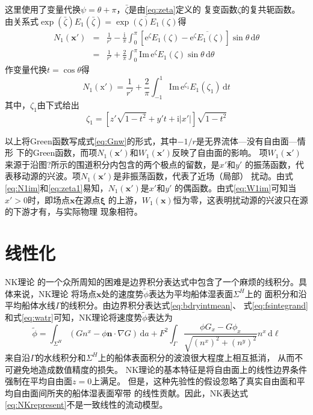 这里使用了变量代换$\psi=\theta+\pi$，$\bar{\zeta}$是由\eqref{eq:zeta}定义的
复变函数$\zeta$的复共轭函数。由关系式$\exp(\bar{\zeta})E_1(\bar{\zeta})=\overline{\exp(\zeta)E_1(\zeta)}$得
\begin{eqnarray*}
  N_1(\mathbf{x'})&=&\frac{1}{r'}-\frac{\mathrm{i}}{\pi}\int_0^\pi[\mathrm{e}^\zeta E_1(\zeta)-\overline{\mathrm{e}^\zeta E_1(\zeta)}]\sin\theta\,\mathrm{d}\theta\\
  &=&\frac{1}{r'}+\frac{2}{\pi}\int_0^\pi\mathrm{Im}\,\mathrm{e}^\zeta E_1(\zeta)
  \sin\theta\,\mathrm{d}\theta
\end{eqnarray*}
作变量代换$t=\cos\theta$得
\begin{equation}
  N_1(\mathrm{x'})=\frac{1}{r'}+\frac{2}{\pi}\int_{-1}^1\mathrm{Im}\,
  \mathrm{e}^{\zeta_1} E_1(\zeta_1)\,\mathrm{d}t
  \label{eq:N1im}
\end{equation}
其中，$\zeta_1$由下式给出
\begin{equation}
  \zeta_1=[z'\sqrt{1-t^2}+y't+\mathrm{i}|x'|]\sqrt{1-t^2}
  \label{eq:zeta1}
\end{equation}

以上将Green函数写成式\eqref{eq:Gnw}的形式，其中$-1/r$是无界流体---没有自由面---情形
下的Green函数，而项$N_1(\mathbf{x'})$和$W_1(\mathbf{x'})$反映了自由面的影响。
项$W_1(\mathbf{x'})$来源于沿图?所示的围道积分内包含的两个极点的留数，是$x'$和$y'$
的振荡函数，代表移动源的兴波。项$N_1(\mathbf{x'})$是非振荡函数，代表了近场（局部）
扰动。由式\eqref{eq:N1im}和\eqref{eq:zeta1}易知，$N_1(\mathbf{x'})$是$x'$和$y'$
的偶函数。由式\eqref{eq:W1im}可知当$x'>0$时，即场点$\mathbf{x}$在源点$\bm{\xi}$
的上游，$W_1(\mathbf{x})$恒为零，这表明扰动源的兴波只在源的下游才有，与实际物理
现象相符。

\section{线性化}
\label{sec:linearization}
NK理论\supercite{Brard1972representation,Gueval1974distribution}
的一个众所周知的困难是边界积分表达式中包含了一个麻烦的线积分。具体来说，NK理论
将场点$\mathbf{x}$处的速度势$\tilde{\phi}$表达为平均船体湿表面$\Sigma^H$上的
面积分和沿平均船体水线$\Gamma$的线积分。由边界积分表达式\eqref{eq:bdryintmean}、
式\eqref{eq:fsintegrand}和式\eqref{eq:watr}可知，NK理论将速度势$\tilde{\phi}$表达为
\begin{equation}
  \tilde{\phi}=\int_{\Sigma^H}(Gn^x-\phi\mathbf{n}\cdot\nabla G)\,
  \mathrm{d}a+F^2\int_{\Gamma}\frac{\phi G_x - G\phi_x}{\sqrt{(n^x)^2+(n^y)^2}}n^x\,
  \mathrm{d}\ell
  \label{eq:NKrepresent}
\end{equation}
来自沿$\Gamma$的水线积分和$\Sigma^H$上的船体表面积分的波浪很大程度上相互抵消，
从而不可避免地造成数值精度的损失。
NK理论的基本特征是将自由面上的线性边界条件强制在平均自由面$z=0$上满足。
但是，这种先验性的假设忽略了真实自由面和平均自由面间所夹的船体湿表面窄带
的线性贡献。因此，NK表达式\eqref{eq:NKrepresent}不是一致线性的流动模型。

